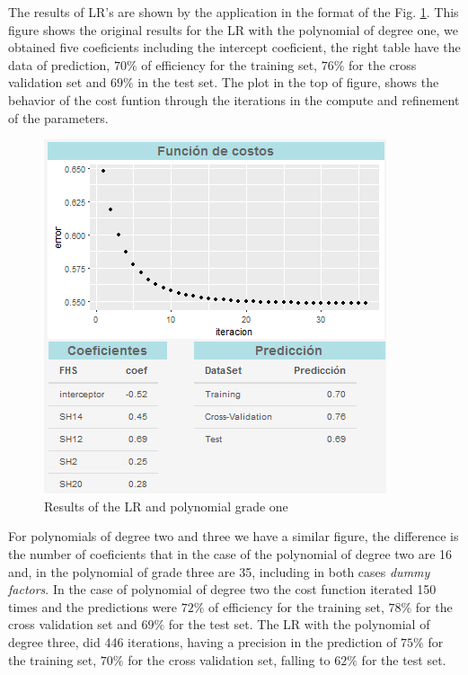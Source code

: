 \documentclass[]{book}
\begin{document}
The results of LR's are shown by the application in the format of the
Fig. \ref{fig:lr-poly-1}. This figure shows the original results for the
LR with the polynomial of degree one, we obtained five coeficients
including the intercept coeficient, the right table have the data of
prediction, \(70\%\) of efficiency for the training set, \(76\%\) for
the cross validation set and \(69\%\) in the test set. The plot in the
top of figure, shows the behavior of the cost funtion through the
iterations in the compute and refinement of the parameters.

\begin{figure}[H]

{\centering \includegraphics[width=0.8\linewidth]{images/lr-poly-1} 

}

\caption{Results of the LR and polynomial grade one}\label{fig:lr-poly-1}
\end{figure}

For polynomials of degree two and three we have a similar figure, the
difference is the number of coeficients that in the case of the
polynomial of degree two are 16 and, in the polynomial of grade three
are 35, including in both cases \emph{dummy factors}. In the case of
polynomial of degree two the cost function iterated 150 times and the
predictions were \(72\%\) of efficiency for the training set, \(78\%\)
for the cross validation set and \(69\%\) for the test set. The LR with
the polynomial of degree three, did 446 iterations, having a precision
in the prediction of \(75\%\) for the training set, \(70\%\) for the
cross validation set, falling to \(62\%\) for the test set.
\end{document}
